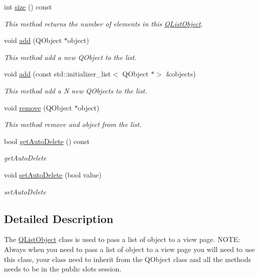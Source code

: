 \begin{DoxyCompactItemize}
int \hyperlink{class_q_list_object_a4ded55097ea08fa5781240883a591216}{size} () const
\begin{DoxyCompactList}\small\item\em This method returns the number of elements in this \hyperlink{class_q_list_object}{Q\+List\+Object}. \end{DoxyCompactList}\item 
void \hyperlink{class_q_list_object_ad5e960eabd3e9b7d49228ea7549a9bd7}{add} (Q\+Object $\ast$object)
\begin{DoxyCompactList}\small\item\em This method add a new Q\+Object to the list. \end{DoxyCompactList}\item 
\mbox{\label{class_q_list_object_a8114f712189da4ae507ffb4a12eec2f3}} 
void \hyperlink{class_q_list_object_a8114f712189da4ae507ffb4a12eec2f3}{add} (const std\+::initializer\+\_\+list$<$ Q\+Object $\ast$$>$ \&objects)
\begin{DoxyCompactList}\small\item\em This method add a N new Q\+Objects to the list. \end{DoxyCompactList}\item 
void \hyperlink{class_q_list_object_af6bc1883142f976bfd3e82c9d0c030bb}{remove} (Q\+Object $\ast$object)
\begin{DoxyCompactList}\small\item\em This method remove and object from the list. \end{DoxyCompactList}\item 
bool \hyperlink{class_q_list_object_ad9d1f7e3c9f2563bcded31b02edc06fb}{get\+Auto\+Delete} () const
\begin{DoxyCompactList}\small\item\em get\+Auto\+Delete \end{DoxyCompactList}\item 
void \hyperlink{class_q_list_object_a6c30632fb46f8f7d404f77a9fea49bee}{set\+Auto\+Delete} (bool value)
\begin{DoxyCompactList}\small\item\em set\+Auto\+Delete \end{DoxyCompactList}\end{DoxyCompactItemize}


\subsection{Detailed Description}
The \hyperlink{class_q_list_object}{Q\+List\+Object} class is used to pass a list of object to a view page. N\+O\+TE\+: Always when you need to pass a list of object to a view page you will need to use this class, your class need to inherit from the Q\+Object class and all the methods needs to be in the public slots session. 

